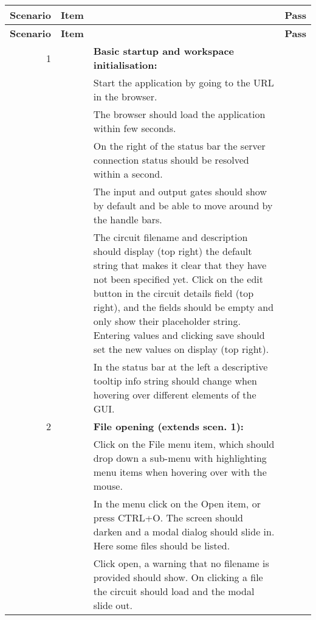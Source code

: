 \documentclass{article}
\newcounter{step}
\newcommand{\step}{\arabic{step}\stepcounter{step}}
\begin{document}
\begin{center}
\begin{longtable}{r r  p{} l } \toprule
\textbf{Scenario} & \textbf{Item} & & \textbf{Pass} \\\midrule
\endfirsthead
\toprule
\textbf{Scenario} & \textbf{Item} & & \textbf{Pass} \\\midrule
\endhead

1 && \textbf{Basic startup and workspace initialisation:}\\
&\step& Start the application by going to the URL in the browser.\\
&\step& The browser should load the application within few seconds.\\
&\step& On the right of the status bar the server connection status should be resolved within a second. \\
&\step& The input and output gates should show by default and be able to move around by the handle bars. \\
&\step& The circuit filename and description should display (top right) the default string that makes it clear that they have not been specified yet. Click on the edit button in the circuit details field (top right), and the fields should be empty and only show their placeholder string. Entering values and clicking save should set the new values on display (top right).\\
&\step& In the status bar at the left a descriptive tooltip info string should change when hovering over different elements of the GUI. & \\ \midrule

2 &\setcounter{step}{1}& \textbf{File opening (extends scen. 1):}\\
&\step& Click on the File menu item, which should drop down a sub-menu with highlighting menu items when hovering over with the mouse. \\
&\step& In the menu click on the Open item, or press CTRL+O. The screen should darken and a modal dialog should slide in. Here some files should be listed.\\
&\step& Click open, a warning that no filename is provided should show. On clicking a file the circuit should load and the modal slide out.\\\midrule


\end{longtable}
\end{center}
\end{document}
